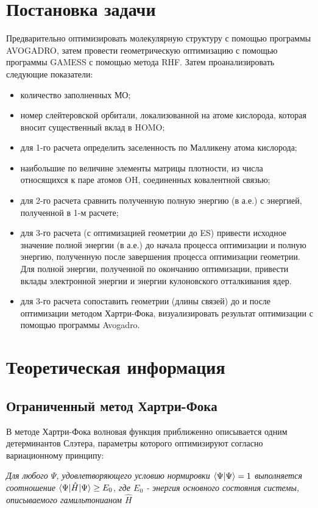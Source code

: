 \section{Постановка задачи}
Предварительно оптимизировать молекулярную структуру с помощью программы AVOGADRO, затем провести геометрическую оптимизацию с помощью программы GAMESS с помощью метода RHF. Затем проанализировать следующие показатели: 
\begin{itemize}
    \item количество заполненных МО; 
    \item номер слейтеровской орбитали, локализованной на атоме кислорода, которая вносит существенный вклад в HOMO;
    \item для 1-го расчета определить заселенность по Малликену атома кислорода;
    \item наибольшие по величине элементы матрицы плотности, из числа относящихся к паре атомов OH, соединенных ковалентной связью;
    \item для 2-го расчета сравнить полученную полную энергию (в а.е.) с энергией, полученной в 1-м расчете;
    \item для 3-го расчета (с оптимизацией геометрии до ES) привести исходное значение полной энергии (в а.е.) до начала процесса оптимизации и полную энергию, полученную после завершения процесса оптимизации геометрии. Для полной энергии, полученной по окончанию оптимизации, привести вклады электронной энергии и энергии кулоновского отталкивания ядер.
    \item для 3-го расчета сопоставить геометрии (длины связей) до и после оптимизации методом Хартри-Фока, визуализировать результат оптимизации с помощью программы Avogadro.
\end{itemize}

\newpage
\section{Теоретическая информация}
\subsection{Ограниченный метод Хартри-Фока}
В методе Хартри-Фока волновая функция приближенно описывается одним детерминантов Слэтера, параметры которого оптимизируют согласно вариационному принципу:\par\textit{
Для любого $\Psi$, удовлетворяющего условию нормировки $\braket{\Psi|\Psi} = 1$ выполняется соотношение $\braket{\Psi|\hat{H}|\Psi} \geq E_0$, где $E_0$ - энергия основного состояния системы, описываемого гамильтонианом $\hat{H}$}

